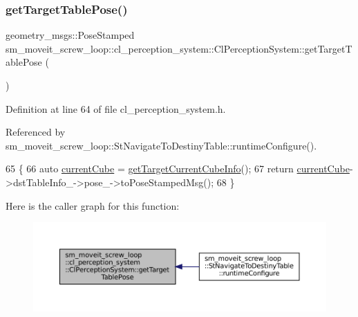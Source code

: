 \subsubsection{\texorpdfstring{get\+Target\+Table\+Pose()}{getTargetTablePose()}}
{\footnotesize\ttfamily geometry\+\_\+msgs\+::\+Pose\+Stamped sm\+\_\+moveit\+\_\+screw\+\_\+loop\+::cl\+\_\+perception\+\_\+system\+::\+Cl\+Perception\+System\+::get\+Target\+Table\+Pose (\begin{DoxyParamCaption}{ }\end{DoxyParamCaption})\hspace{0.3cm}{\ttfamily [inline]}}



Definition at line 64 of file cl\+\_\+perception\+\_\+system.\+h.



Referenced by sm\+\_\+moveit\+\_\+screw\+\_\+loop\+::\+St\+Navigate\+To\+Destiny\+Table\+::runtime\+Configure().


\begin{DoxyCode}
65             \{
66                 \textcolor{keyword}{auto} \hyperlink{classsm__moveit__screw__loop_1_1cl__perception__system_1_1ClPerceptionSystem_a21d95597754f74b644602b8697bb07dc}{currentCube} = \hyperlink{classsm__moveit__screw__loop_1_1cl__perception__system_1_1ClPerceptionSystem_ad9231b87b9592cc5c847ce1b92a75446}{getTargetCurrentCubeInfo}();
67                 \textcolor{keywordflow}{return} \hyperlink{classsm__moveit__screw__loop_1_1cl__perception__system_1_1ClPerceptionSystem_a21d95597754f74b644602b8697bb07dc}{currentCube}->dstTableInfo\_->pose\_->toPoseStampedMsg();
68             \}
\end{DoxyCode}
Here is the caller graph for this function\+:
\nopagebreak
\begin{figure}[H]
\begin{center}
\leavevmode
\includegraphics[width=350pt]{classsm__moveit__screw__loop_1_1cl__perception__system_1_1ClPerceptionSystem_aaef94ec7b4e2e9249829d4b24ad2499e_icgraph}
\end{center}
\end{figure}
\mbox{\label{classsm__moveit__screw__loop_1_1cl__perception__system_1_1ClPerceptionSystem_a9f58986a4ad466ba1e5b46e9d4d971ac}} 

